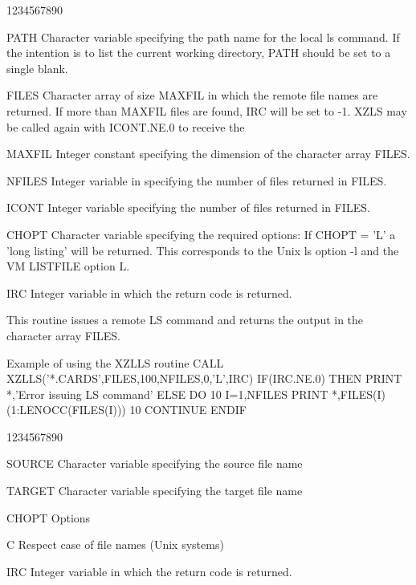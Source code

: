 \begin{DLtt}{1234567890}
\item[PATH]Character variable specifying the path name for the local
ls command. If the intention is to list the current working
directory, PATH should be set to a single blank.
\item[FILES]Character array of size MAXFIL in which the remote file names
are returned. If more than MAXFIL files are found, IRC will be set
to -1. XZLS may be called again with ICONT.NE.0 to receive the
\item[MAXFIL]Integer constant specifying the dimension of the character array
FILES.
\item[NFILES]Integer variable in specifying
the number of files returned in FILES.
\item[ICONT]Integer variable specifying
the number of files returned in FILES.
\item[CHOPT]Character variable specifying the required options:
If CHOPT = 'L' a 'long listing' will be returned.
This corresponds to the Unix ls option -l and the VM LISTFILE option L.
\item[IRC]Integer variable in which the return code is returned.
\end{DLtt}
\par
This routine issues a remote LS command and returns the output
in the character array FILES.
\begin{XMPt}{Example of using the XZLLS routine}
      CALL XZLLS('*.CARDS',FILES,100,NFILES,0,'L',IRC)
      IF(IRC.NE.0) THEN
         PRINT *,'Error issuing LS command'
      ELSE
         DO 10 I=1,NFILES
            PRINT *,FILES(I)(1:LENOCC(FILES(I)))
10       CONTINUE
      ENDIF
\end{XMPt}
\begin{DLtt}{1234567890}
\item[SOURCE]Character variable specifying the source file name
\item[TARGET]Character variable specifying the target file name
\item[CHOPT]Options
\begin{DLtt}{12}
\item[C]Respect case of file names (Unix systems)
\end{DLtt}
\item[IRC]Integer variable in which the return code is returned.
\end{DLtt}

